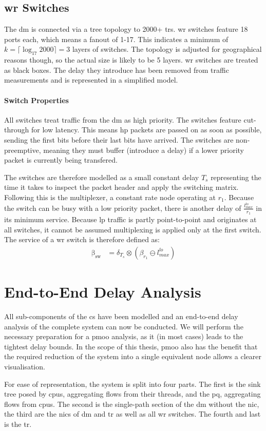 \subsection{\gls{wr} Switches}

The \gls{dm} is connected via a tree topology to 2000+ \gls{tr}s. \gls{wr} switches feature 18 ports each, which means a fanout of 1-17. 
This indicates a minimum of $k = \lceil \log_{17} 2000 \rceil = 3$ layers of switches. The topology is adjusted for geographical reasons though, so the actual size is likely to be 5 layers.
\gls{wr} switches are treated as black boxes. The delay they introduce has been removed from traffic measurements and is represented in a simplified model.

\paragraph{Switch Properties}
All switches treat traffic from the \gls{dm} as high priority. The switches feature cut-through for low latency. This means \gls{hp} packets are passed on as soon as possible,
sending the first bits before their last bits have arrived. The switches are non-preemptive, meaning they must buffer (introduce a delay) if a lower priority packet is currently being transfered.
\par
The switches are therefore modelled as a small constant delay $T_s$ representing the time it takes to inspect the packet header and apply the switching matrix.
Following this is the multiplexer, a constant rate node operating at $r_1$. Because the switch can be busy with a low priority packet, there is another delay of $\frac{l^{lo}_{max}}{r_1}$
in its minimum service. Because \gls{lp} traffic is partly point-to-point and originates at all switches, it cannot be assumed multiplexing is applied only at the first switch.
The service of a \gls{wr} switch is therefore defined as:
%
\begin{equation}
\begin{aligned}
\mathrm{\beta_{sw}} &=  \delta_{T_s} \otimes (\beta_{r_1} \ominus l^{lo}_{max})
\label{eq:wr-sw}
\end{aligned}
\end{equation}
%
\section{End-to-End Delay Analysis}
\label{sec:e2e_da}
All sub-components of the  \gls{cs} have been modelled and an end-to-end delay analysis of the complete system can now be conducted.
We will perform the necessary preparation for a \gls{pmoo} analysis, as it (in most cases) leads to the tightest delay bounds.
In the scope of this thesis, \gls{pmoo} also has the benefit that the required reduction of the system into a single equivalent node allows a clearer visualisation.
\par
For ease of representation, the system is split into four parts. The first is the sink tree posed by \gls{cpu}s, aggregating flows from their threads,
and the \gls{pq}, aggregating flows from \gls{cpu}s. The second is the single-path section of the \gls{dm} without the \gls{nic}, the third are the \gls{nic}s of \gls{dm} and \gls{tr}
as well as all \gls{wr} switches. The fourth and last is the \gls{tr}.
